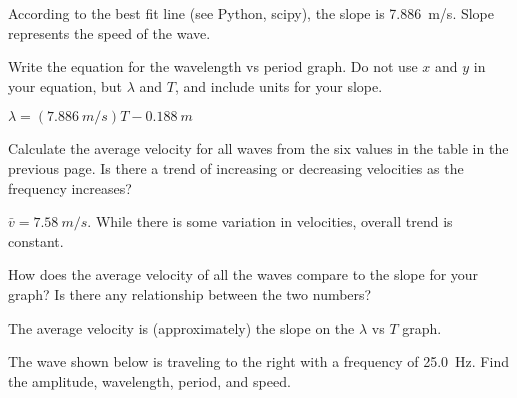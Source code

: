 \documentclass[]{exam}
\begin{document}
\begin{questions}
\begin{solutionorbox}[2cm]
According to the best fit line (see Python, scipy), the slope is \SI{7.886}{m/s}. Slope represents the speed of the wave. 
\end{solutionorbox}

\question
Write the equation for the wavelength vs period graph. Do not use $x$ and $y$ in your equation, but $\lambda$ and $T$, and include units for your slope. 

\ifprintanswers
{\color{red} $\lambda = (\SI{7.886}{m/s}) T - \SI{0.188}{m}$

\vspace{-5mm}
}

\fi

\fillwithlines{8mm}



\question
Calculate the average velocity for all waves from the six values in the table in the previous page. Is there a trend of increasing or decreasing velocities as the frequency increases?

\ifprintanswers
{\color{red} $\bar{v} = \SI{7.58}{m/s}$. While there is some variation in velocities, overall trend is constant.

\vspace{-5mm}
}
\fi

\fillwithlines{8mm}

\question
How does the average velocity of all the waves compare to the slope for your graph? Is there any relationship between the two numbers?

\ifprintanswers
{\color{red}
The average velocity is (approximately) the slope on the $\lambda$ vs $T$ graph.

\vspace{-5mm}
}
\fi

\fillwithlines{8mm}


\question
The wave shown below is traveling to the right with a frequency  of \SI{25.0}{Hz}. Find the amplitude, wavelength, period, and speed.

\begin{EnvUplevel}
\begin{minipage}{7.5cm}
\centering
{}
\end{minipage}
\hspace{5mm}
\fbox{
\begin{minipage}{7.5cm}
{
\ifprintanswers
\color{red}
\else
\color{white}
\fi

}
\end{minipage}}
\end{EnvUplevel}
\end{questions}
\end{document}
